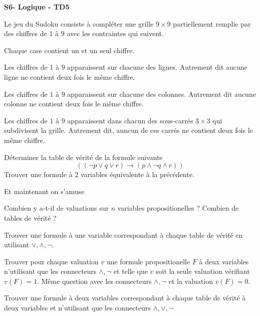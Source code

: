 \documentclass[french]{report}
\begin{document}
\begin{center}
    \huge{\textbf{S6- Logique - TD5}}
\end{center}

\begin{exo}
    Le jeu du Sudoku consiste à compléter une grille \(9\times 9\) partiellement remplie
    par des chiffres de \(1\) à \(9\) avec les contraintes qui suivent.
    \begin{q}{1}
        Chaque case contient un et un seul chiffre.
    \end{q}
    \begin{q}{2}
        Les chiffres de \(1\) à \(9\) apparaissent sur chacune des lignes. Autrement
        dit aucune ligne ne contient deux fois le même chiffre.
    \end{q}
    \begin{q}{3}
        Les chiffres de \(1\) à \(9\) apparaissent sur chacune des colonnes. Autrement
        dit aucune colonne ne contient deux fois le même chiffre.
    \end{q}
    \begin{q}{4}
        Les chiffres de \(1\) à \(9\) apparaissent dans chacun des sous-carrés \(3\times 3\)
        qui subdivisent la grille. Autrement dit, auncun de ces carrés ne contient
        deux fois le même chiffre.
    \end{q}
\end{exo}

\begin{exo}
    Déterminer la table de vérité de la formule suivante
    \[\left(\left(\lnot p\lor q\lor r\right)\rightarrow\left(p\land\lnot q\land
    r\right)\right)\] Trouver une formule à \(2\) variables équivalente à
    la précédente.
\end{exo}

\begin{exo}
    Et maintenant on s'amuse
    \begin{q}{1}
        Combien y a-t-il de valuations sur \(n\) variables propositionelles ?
        Combien de tables de vérité ?
    \end{q}
    \begin{q}{2}
        Trouver une formule à une variable correspondant à chaque table de vérité
        en utilisant \(\lor,\land,\lnot\).
    \end{q}
    \begin{q}{3}
        Trouver pour chaque valuation \(v\) une formule propositionelle \(F\)
        à deux variables n'utilisant que les connecteurs \(\land,\lnot\) et telle
        que \(v\) soit la seule valuation vérifiant \(v(F)=1\). Même question avec
        les connecteurs \(\land,\lnot\) et la valuation \(v(F)=0\).
    \end{q}
    \begin{q}{4}
        Trouver une formule à deux variables correspondant à chaque table de
        vérité à deux variables et n'utilisant que les connecteurs \(\land,\lor,\lnot\)
    \end{q}
\end{exo}
\end{document}
